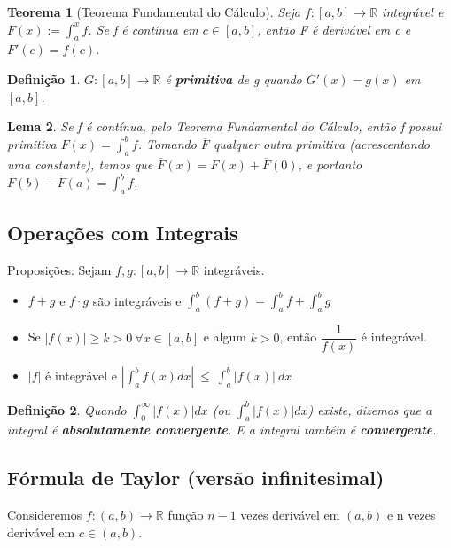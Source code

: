 \documentclass[12pt]{article}
\newtheorem{theorem}{Teorema}[section]
\newtheorem{lemma}[theorem]{Lema}
\newtheorem{definition}{Definição}
\begin{document}
\begin{theorem}[Teorema Fundamental do Cálculo]
    Seja $f:[a, b] \rightarrow{} \mathbb{R}$ integrável e $F(x):= \int_a^x f$. Se f é contínua em $c \in [a, b]$, então F é derivável em c e $F'(c) = f(c)$.
\end{theorem}

\begin{definition}
    $G: [a, b] \rightarrow{} \mathbb{R}$ é \textbf{primitiva} de g quando $G'(x) = g(x)$ em $[a, b]$.
\end{definition}

\begin{lemma}
    Se f é contínua, pelo Teorema Fundamental do Cálculo, então f possui primitiva $F(x) = \int_a^b f$. Tomando $\overline{F}$ qualquer outra primitiva (acrescentando uma constante), temos que $\overline{F} (x) = F(x) + \overline{F} (0)$, e portanto $\overline{F} (b) - \overline{F} (a) = \int_a^b f$.
\end{lemma}

\subsection{Operações com Integrais}
Proposições:
Sejam $f, g: [a, b] \rightarrow{} \mathbb{R}$ integráveis.
\begin{itemize}
    \item $f +g$ e $f \cdot g$ são integráveis e $\int_a^b (f +g) = \int_a^b f + \int_a^b g$
    
    \item Se $|f(x)| \geq k > 0 \ \forall x \in [a, b]$ e algum $k > 0$, então $\dfrac{1}{f(x)}$ é integrável.
    
    \item $|f|$ é integrável e $|\int_a^b f(x) dx|\ \leq\ \int_a^b |f(x)|\ dx$
\end{itemize}

\begin{definition}
    Quando $\int_0^\infty |f(x)| dx$ (ou $\int_a^b |f(x)| dx$) existe, dizemos que a integral é \textbf{absolutamente convergente}. E a integral também é \textbf{convergente}.
\end{definition}

\subsection{Fórmula de Taylor (versão infinitesimal)}
Consideremos $f: (a, b) \rightarrow{} \mathbb{R}$ função $n-1$ vezes derivável em $(a, b)$ e n vezes derivável em $c \in (a, b)$.
\end{document}
